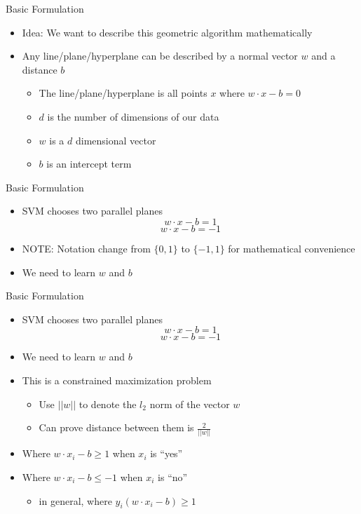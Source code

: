 \documentclass[aspectratio=169]{beamer}
\begin{document}
\begin{frame}{Basic Formulation}

\begin{itemize}
\item Idea: We want to describe this geometric algorithm mathematically
\item Any line/plane/hyperplane can be described by a normal vector $w$ and a distance $b$
	\begin{itemize}
	\item The line/plane/hyperplane is all points $x$ where $w \cdot x - b = 0$
	\item $d$ is the number of dimensions of our data
	\item $w$ is a $d$ dimensional vector
	\item $b$ is an intercept term
	\end{itemize}
\end{itemize}
\end{frame}
\begin{frame}{Basic Formulation}

\begin{itemize}
\item SVM chooses two parallel planes 
$$w \cdot x - b = 1$$ 
$$w \cdot x - b = -1$$
\item NOTE: Notation change from $\{0, 1\}$ to $\{-1, 1\}$ for mathematical convenience
\item We need to learn $w$ and $b$
\end{itemize}
\end{frame}
\begin{frame}{Basic Formulation}

\begin{itemize}
\item SVM chooses two parallel planes 
$$w \cdot x - b = 1$$ 
$$w \cdot x - b = -1$$
\item We need to learn $w$ and $b$
\item This is a constrained maximization problem
	\begin{itemize}
	\item Use $||w||$ to denote the $l_2$ norm of the vector $w$ %
	\item Can prove distance between them is $\frac{2}{||w||}$
	\end{itemize}
\item Where $w \cdot x_i - b \geq 1$ when $x_i$ is ``yes''
\item Where $w \cdot x_i - b \leq -1$ when $x_i$ is ``no''
	\begin{itemize}
	\item in general, where $y_i (w \cdot x_i - b) \geq 1$
	\end{itemize}
\end{itemize}
\end{frame}
\end{document}
